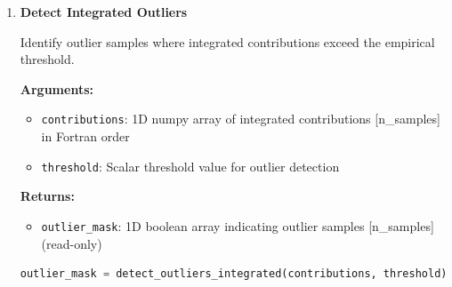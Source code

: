 \documentclass[11pt]{article}
\begin{document}
\begin{enumerate}
\begin{enumerate}
	      	      \textbf{Arguments:}
	      	      \begin{itemize}
	      	      	\item \texttt{contributions}: 1D numpy array of integrated contributions
	      	      	      [n\_samples] in Fortran order
	      	      	      
	      	      	\item \texttt{percentile\_val}: Percentile value for threshold (0.0--100.0)
	      	      \end{itemize}
	      	      \textbf{Returns:}
	      	      \begin{itemize}
	      	      	\item \texttt{threshold}: Scalar threshold value
	      	      \end{itemize}
	      	      \begin{lstlisting}[language=Python, caption={Integrated Threshold Calculation}]
threshold = calc_integrated_threshold(contributions, percentile_val)
	      	      \end{lstlisting}
	      	      
	      	\item \textbf{Detect Integrated Outliers}
	      	      
	      	      Identify outlier samples where integrated contributions exceed the empirical
	      	      threshold.
	      	      
	      	      \textbf{Arguments:}
	      	      \begin{itemize}
	      	      	\item \texttt{contributions}: 1D numpy array of integrated contributions
	      	      	      [n\_samples] in Fortran order
	      	      	      
	      	      	\item \texttt{threshold}: Scalar threshold value for outlier detection
	      	      \end{itemize}
	      	      \textbf{Returns:}
	      	      \begin{itemize}
	      	      	\item \texttt{outlier\_mask}: 1D boolean array indicating outlier samples
	      	      	      [n\_samples] (read-only)
	      	      \end{itemize}
	      	      \begin{lstlisting}[language=Python, caption={Integrated Outlier Detection}]
outlier_mask = detect_outliers_integrated(contributions, threshold)
	      	      \end{lstlisting}
	      	      

\end{enumerate}
\end{enumerate}
\end{document}
